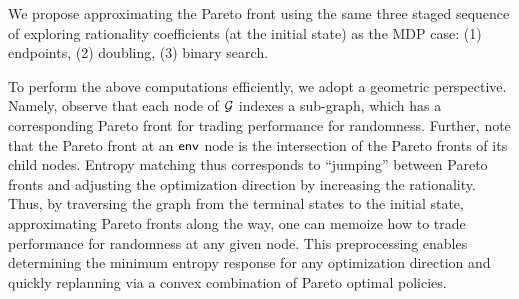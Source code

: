 We propose approximating the  Pareto front using the same three staged sequence of exploring 
rationality coefficients (at the initial state) as the MDP case: (1) endpoints, (2) doubling,
(3) binary search.

To perform the above computations efficiently, we adopt a geometric
perspective. Namely, observe that each node of $\mathcal{G}$ indexes a
sub-graph, which has a corresponding Pareto front for trading
performance for randomness. Further, note that the Pareto front at an
$\mathsf{env}$ node is the intersection of the Pareto fronts of its child
nodes. Entropy matching thus corresponds to ``jumping'' between Pareto
fronts and adjusting the optimization direction by increasing the
rationality.  Thus, by traversing the graph from the terminal states
to the initial state, approximating Pareto fronts along the way, one
can memoize how to trade performance for randomness at any given
node. This preprocessing enables determining the minimum entropy
response for any optimization direction and quickly replanning via a
convex combination of Pareto optimal policies.





